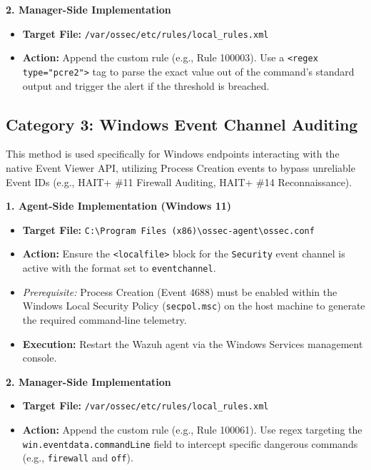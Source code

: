 \textbf{2. Manager-Side Implementation}
\begin{itemize}
    \item \textbf{Target File:} \texttt{/var/ossec/etc/rules/local\_rules.xml}
    \item \textbf{Action:} Append the custom rule (e.g., Rule 100003). Use a \texttt{<regex type="pcre2">} tag to parse the exact value out of the command's standard output and trigger the alert if the threshold is breached.
\end{itemize}

\subsection{Category 3: Windows Event Channel Auditing}
This method is used specifically for Windows endpoints interacting with the native Event Viewer API, utilizing Process Creation events to bypass unreliable Event IDs (e.g., HAIT+ \#11 Firewall Auditing, HAIT+ \#14 Reconnaissance).

\textbf{1. Agent-Side Implementation (Windows 11)}
\begin{itemize}
    \item \textbf{Target File:} \texttt{C:\textbackslash Program Files (x86)\textbackslash ossec-agent\textbackslash ossec.conf}
    \item \textbf{Action:} Ensure the \texttt{<localfile>} block for the \texttt{Security} event channel is active with the format set to \texttt{eventchannel}. 
    \item \textit{Prerequisite:} Process Creation (Event 4688) must be enabled within the Windows Local Security Policy (\texttt{secpol.msc}) on the host machine to generate the required command-line telemetry.
    \item \textbf{Execution:} Restart the Wazuh agent via the Windows Services management console.
\end{itemize}

\textbf{2. Manager-Side Implementation}
\begin{itemize}
    \item \textbf{Target File:} \texttt{/var/ossec/etc/rules/local\_rules.xml}
    \item \textbf{Action:} Append the custom rule (e.g., Rule 100061). Use regex targeting the \texttt{win.eventdata.commandLine} field to intercept specific dangerous commands (e.g., \texttt{firewall} and \texttt{off}).
\end{itemize}